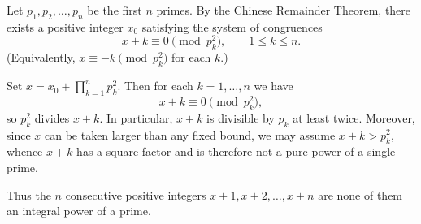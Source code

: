 Let $p_1, p_2, \dots, p_n$ be the first $n$ primes. By the Chinese Remainder Theorem, there exists a positive integer $x_0$ satisfying the system of congruences
\[
x + k \equiv 0 \pmod{p_k^2}, \qquad 1 \leq k \leq n.
\]
(Equivalently, $x \equiv -k \pmod{p_k^2}$ for each $k$.)

Set $x = x_0 + \prod_{k=1}^n p_k^2$. Then for each $k = 1, \dots, n$ we have
\[
x + k \equiv 0 \pmod{p_k^2},
\]
so $p_k^2$ divides $x + k$. In particular, $x + k$ is divisible by $p_k$ at least twice. Moreover, since $x$ can be taken larger than any fixed bound, we may assume $x + k > p_k^2$, whence $x + k$ has a square factor and is therefore not a pure power of a single prime.

Thus the $n$ consecutive positive integers $x+1, x+2, \dots, x+n$ are none of them an integral power of a prime.
